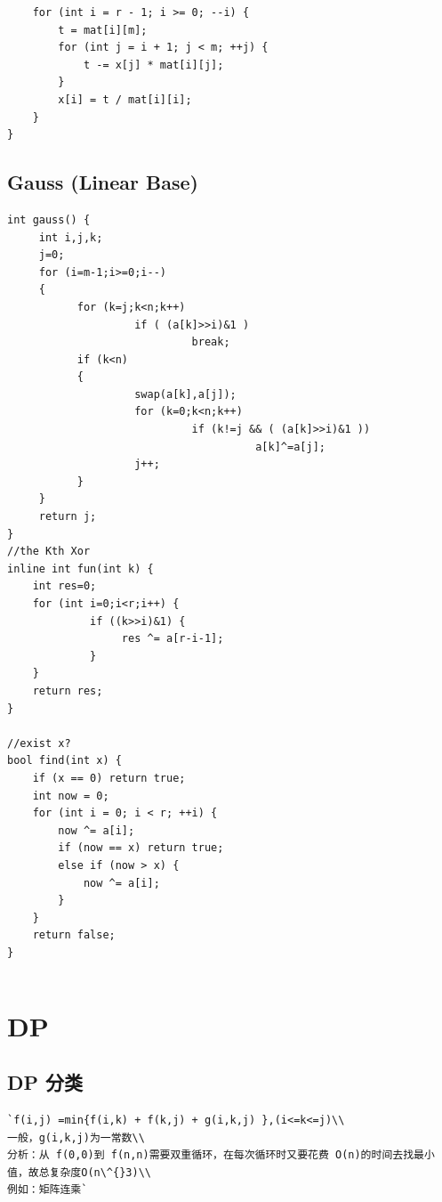 \documentclass[a4paper]{article}
\begin{document}
\begin{CJK*}{UTF8}{gbsn}
\begin{multicols}{3}
\begin{flushleft}
\begin{lstlisting}
    for (int i = r - 1; i >= 0; --i) {
        t = mat[i][m];
        for (int j = i + 1; j < m; ++j) {
            t -= x[j] * mat[i][j];
        }
        x[i] = t / mat[i][i];
    }
}
\end{lstlisting}

\subsection{Gauss (Linear Base)}
\begin{lstlisting}
int gauss() {
     int i,j,k;
     j=0;
     for (i=m-1;i>=0;i--)
     {
           for (k=j;k<n;k++)
                    if ( (a[k]>>i)&1 )
                             break;
           if (k<n)
           {
                    swap(a[k],a[j]);
                    for (k=0;k<n;k++)
                             if (k!=j && ( (a[k]>>i)&1 ))
                                       a[k]^=a[j];
                    j++;
           }
     }
     return j;
}
//the Kth Xor
inline int fun(int k) {
    int res=0;
    for (int i=0;i<r;i++) {
             if ((k>>i)&1) {
                  res ^= a[r-i-1];
             }
    }
    return res;
}

//exist x?
bool find(int x) {
    if (x == 0) return true;
    int now = 0;
    for (int i = 0; i < r; ++i) {
        now ^= a[i];
        if (now == x) return true;
        else if (now > x) {
            now ^= a[i];
        }
    }
    return false;
}
\end{lstlisting}


\begin{lstlisting}
\end{lstlisting}



\section{DP}

\subsection{DP 分类}
\begin{lstlisting}
`f(i,j) =min{f(i,k) + f(k,j) + g(i,k,j) },(i<=k<=j)\\
一般，g(i,k,j)为一常数\\
分析：从 f(0,0)到 f(n,n)需要双重循环，在每次循环时又要花费 O(n)的时间去找最小值，故总复杂度O(n\^{}3)\\
例如：矩阵连乘`
\end{lstlisting}


\end{flushleft}
\end{multicols}
\end{CJK*}
\end{document}
